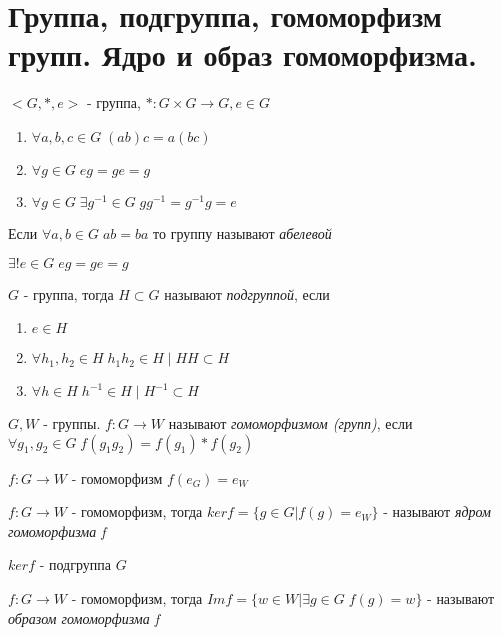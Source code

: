 \section{Группа, подгруппа, гомоморфизм групп. Ядро и образ гомоморфизма.}

\begin{defn}
   \(<G, *, e>\) - группа, 
   \(*: G \times G \rightarrow G, e \in G \) 
   \begin{enumerate}       
     \item \( \forall a, b, c \in G \; (ab)c=a(bc) \)
     \item \( \forall g \in G \; eg = ge = g \)
     \item \( \forall g \in G \; \exists g^{-1} \in G \; gg^{-1} = g^{-1}g = e \)
   \end{enumerate}
   Если \( \forall a, b \in G \; ab = ba \) то группу называют \emph{абелевой} 
\end{defn}

\begin{thm}
  \( \exists ! e \in G \; eg = ge = g \)
\end{thm}

\begin{defn}
  \( G \) - группа, тогда \( H \subset G \) называют \emph{подгруппой}, если 
  \begin{enumerate}
    \item \( e \in H \)
    \item \( \forall h_1, h_2 \in H \; h_{1}h_{2} \in H \; | \; HH \subset H \)
    \item \( \forall h \in H \; h^{-1} \in H \; | \; H^{-1} \subset H \)
  \end{enumerate}
\end{defn}

\begin{defn}
  \( G, W \) - группы. \newline
  \( f: G \rightarrow W \) называют \emph{гомоморфизмом (групп)}, если \( \forall g_1, g_2 \in G \; f(g_{1}g_2) = f(g_1) * f(g_2) \)
\end{defn}

\begin{thm}
  \( f: G \rightarrow W \) - гомоморфизм \newline
  \( f(e_G) = e_W \)
\end{thm}

\begin{defn}
    \( f: G \rightarrow W \) - гомоморфизм, тогда \newline
    \( ker f = \{ g \in G | f(g) = e_W \} \) - называют \emph{ядром гомоморфизма f}
\end{defn}

\begin{thm}
  \( ker f \) - подгруппа \( G \)
\end{thm}

\begin{defn}
   \( f: G \rightarrow W \) - гомоморфизм, тогда \newline
   \( Im f = \{ w \in W | \exists g \in G \; f(g) = w \} \) - называют \emph{образом гомоморфизма f}
\end{defn}
